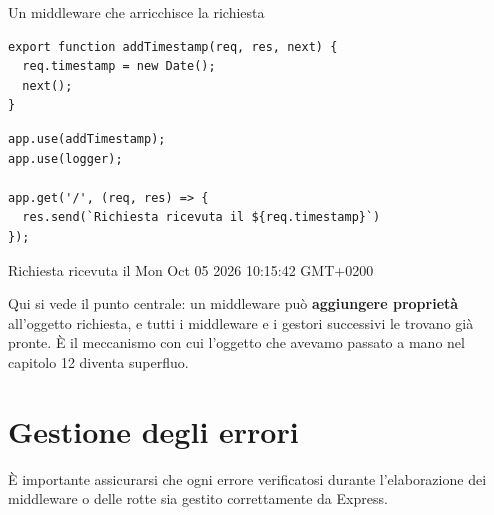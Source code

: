 \begin{esempio}{Un middleware che arricchisce la richiesta}
\begin{affianco}[0.45]
\begin{lstlisting}[style=js, name=middleware.js]
export function addTimestamp(req, res, next) {
  req.timestamp = new Date();
  next();
}
\end{lstlisting}
\begin{immagine}
\end{immagine}

\risultato
\begin{lstlisting}[style=js, name=index.js]
app.use(addTimestamp);
app.use(logger);

app.get('/', (req, res) => {
  res.send(`Richiesta ricevuta il ${req.timestamp}`)
});
\end{lstlisting}
\begin{browser}[localhost:3000]
  Richiesta ricevuta il Mon Oct 05 2026 10:15:42 GMT+0200
\end{browser}
\end{affianco}

Qui si vede il punto centrale: un middleware può \textbf{aggiungere proprietà}
all'oggetto richiesta, e tutti i middleware e i gestori successivi le trovano
già pronte. È il meccanismo con cui l'oggetto  che avevamo
passato a mano nel capitolo 12 diventa superfluo.
\end{esempio}


\section{Gestione degli errori}

È importante assicurarsi che ogni errore verificatosi durante l'elaborazione dei
middleware o delle rotte sia gestito correttamente da Express.

